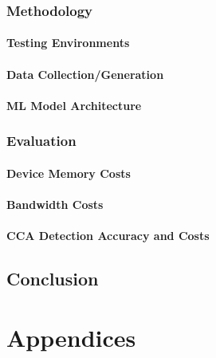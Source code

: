 \documentclass[twoside,hidelinks]{glasgowthesis}
\begin{document}
\section{Methodology}
\subsection{Testing Environments}
\subsection{Data Collection/Generation}
\subsection{ML Model Architecture}
\section{Evaluation}
\subsection{Device Memory Costs}
\subsection{Bandwidth Costs}
\subsection{CCA Detection Accuracy and Costs}



\chapter{Conclusion}


\part{Appendices}
\appendix



\newpage


\renewcommand*{\mkbibnamefamily}[1]{\textsc{#1}}
\renewcommand*{\mkbibnameprefix}[1]{\textsc{#1}}
\printbibliography[title={References}]
\end{document}
